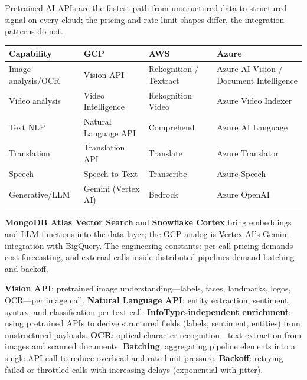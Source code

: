 \begin{crosscloud}
Pretrained AI APIs are the fastest path from unstructured data to structured signal on every cloud; the pricing and rate-limit shapes differ, the integration patterns do not.

\vspace{2mm}
{\footnotesize
\begin{tabular}{@{}p{2.8cm}p{3.0cm}p{3.0cm}p{3.0cm}@{}} \\
\toprule
\textbf{Capability} & \textbf{GCP} & \textbf{AWS} & \textbf{Azure} \\
\midrule
Image analysis/OCR & Vision API & Rekognition / Textract & Azure AI Vision / Document Intelligence \\
Video analysis & Video Intelligence & Rekognition Video & Azure Video Indexer \\
Text NLP & Natural Language API & Comprehend & Azure AI Language \\
Translation & Translation API & Translate & Azure Translator \\
Speech & Speech-to-Text & Transcribe & Azure Speech \\
Generative/LLM & Gemini (Vertex AI) & Bedrock & Azure OpenAI \\
\bottomrule
\end{tabular}}

\vspace{1mm}
\textbf{MongoDB Atlas Vector Search} and \textbf{Snowflake Cortex} bring embeddings and LLM functions into the data layer; the GCP analog is Vertex AI's Gemini integration with BigQuery. The engineering constants: per-call pricing demands cost forecasting, and external calls inside distributed pipelines demand batching and backoff.
\end{crosscloud}

\begin{keyterms}
\textbf{Vision API}: pretrained image understanding---labels, faces, landmarks, logos, OCR---per image call.
\textbf{Natural Language API}: entity extraction, sentiment, syntax, and classification per text call.
\textbf{InfoType-independent enrichment}: using pretrained APIs to derive structured fields (labels, sentiment, entities) from unstructured payloads.
\textbf{OCR}: optical character recognition---text extraction from images and scanned documents.
\textbf{Batching}: aggregating pipeline elements into a single API call to reduce overhead and rate-limit pressure.
\textbf{Backoff}: retrying failed or throttled calls with increasing delays (exponential with jitter).
\end{keyterms}

